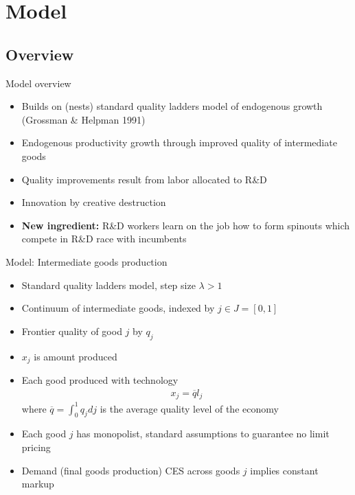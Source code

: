 \documentclass[english,usenames,dvipsnames]{beamer}
\begin{document}
\section{Model}
\subsection{Overview}
\begin{frame}{Model overview}
\begin{itemize}	
	\item Builds on (nests) standard quality ladders model of endogenous growth (Grossman \& Helpman 1991)
	\item Endogenous productivity growth through improved quality of intermediate goods 
	\item Quality improvements result from labor allocated to R\&D
	\item Innovation by creative destruction
	\item \textbf{New ingredient:} R\&D workers learn on the job how to form spinouts which compete in R\&D race with incumbents
\end{itemize}
\end{frame}

\begin{frame}{Model: Intermediate goods production}
\begin{itemize}
	\item Standard quality ladders model, step size $\lambda > 1$
	\item Continuum of intermediate goods, indexed by $j\in J = [0,1]$
	\item Frontier quality of good $j$ by $q_j$
	\item $x_j$ is amount produced 
	\item Each good produced with technology
	\begin{align*}
	x_j = \overline{q} l_j
	\end{align*}
	where $\overline{q} = \int_0^1 q_j dj$ is the average quality level of the economy
	\item Each good $j$ has monopolist, standard assumptions to guarantee no limit pricing 
	\item Demand (final goods production) CES across goods $j$ implies constant markup
\end{itemize}
\end{frame}
\end{document}
